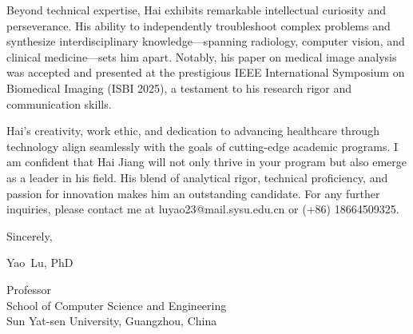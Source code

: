 \documentclass{article}
\begin{document}
Beyond technical expertise, Hai exhibits remarkable intellectual curiosity and perseverance. 
His ability to independently troubleshoot complex problems and synthesize interdisciplinary knowledge—spanning radiology, computer vision, and clinical medicine—sets him apart. 
Notably, his paper on medical image analysis was accepted and presented at the prestigious IEEE International Symposium on Biomedical Imaging (ISBI 2025), a testament to his research rigor and communication skills.

Hai's creativity, work ethic, and dedication to advancing healthcare through technology align seamlessly with the goals of cutting-edge academic programs.
I am confident that Hai Jiang will not only thrive in your program but also emerge as a leader in his field. His blend of analytical rigor, technical proficiency, and passion for innovation makes him an outstanding candidate. 
For any further inquiries, please contact me at luyao23@mail.sysu.edu.cn or (+86) 18664509325.
 


\bigskip %



\begin{FlushLeft}
Sincerely,
\vspace{15pt} %

Yao~Lu, PhD\\
\vspace{30pt}

Professor\\
School of Computer Science and Engineering\\
Sun Yat-sen University, Guangzhou, China\\
\end{FlushLeft}


\end{document}
